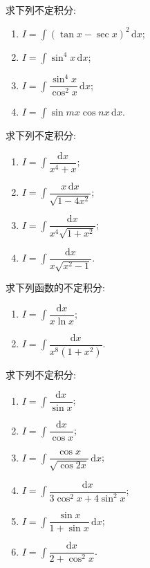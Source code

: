 \documentclass[../数学分析培优讲义.tex]{subfiles}
\begin{document}
\begin{example}
求下列不定积分:
\begin{enumerate}[label=(\arabic*)]
    \item $\displaystyle I=\int(\tan x-\sec x)^2\,\mathrm{d}x$;
    \item $\displaystyle I=\int\sin^4x\,\mathrm{d}x$;
    \item $\displaystyle I=\int\dfrac{\sin^4x}{\cos^2x}\,\mathrm{d}x$;
    \item $\displaystyle I=\int\sin mx\cos nx\,\mathrm{d}x$.
\end{enumerate}
\end{example}
\exampleblank

\begin{example}
求下列不定积分:
\begin{enumerate}[label=(\arabic*)]
    \item $\displaystyle I=\int\dfrac{\mathrm{d}x}{x^4+x}$;
    \item $\displaystyle I=\int\dfrac{x\,\mathrm{d}x}{\sqrt{1-4x^2}}$;
    \item $\displaystyle I=\int\dfrac{\mathrm{d}x}{x^4\sqrt{1+x^2}}$;
    \item $\displaystyle I=\int\dfrac{\mathrm{d}x}{x\sqrt{x^2-1}}$.
\end{enumerate}
\end{example}
\exampleblank

\begin{example}
求下列函数的不定积分:
\begin{enumerate}[label=(\arabic*)]
    \item $\displaystyle I=\int\dfrac{\mathrm{d}x}{x\ln x}$;
    \item $\displaystyle I=\int\dfrac{\mathrm{d}x}{x^8(1+x^2)}$.
\end{enumerate}
\end{example}
\exampleblank

\begin{example}
求下列不定积分:
\begin{enumerate}[label=(\arabic*)]
    \item $\displaystyle I=\int\dfrac{\mathrm{d}x}{\sin x}$;
    \item $\displaystyle I=\int\dfrac{\mathrm{d}x}{\cos x}$;
    \item $\displaystyle I=\int\dfrac{\cos x}{\sqrt{\cos2x}}\,\mathrm{d}x$;
    \item $\displaystyle I=\int\dfrac{\mathrm{d}x}{3\cos^2x+4\sin^2x}$;
    \item $\displaystyle I=\int\dfrac{\sin x}{1+\sin x}\,\mathrm{d}x$;
    \item $\displaystyle I=\int\dfrac{\mathrm{d}x}{2+\cos^2x}$.
\end{enumerate}
\end{example}
\exampleblank
\end{document}
